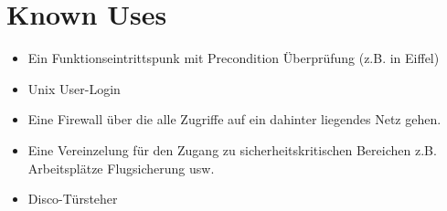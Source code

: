 \section{Known Uses}
\begin{itemize}
  \item Ein Funktionseintrittspunk mit Precondition Überprüfung (z.B. in Eiffel)
  \item Unix User-Login
  \item Eine Firewall über die alle Zugriffe auf ein dahinter liegendes Netz gehen.
  \item Eine Vereinzelung für den Zugang zu sicherheitskritischen Bereichen z.B. Arbeitsplätze Flugsicherung usw.
  \item Disco-T\"ursteher
\end{itemize}

